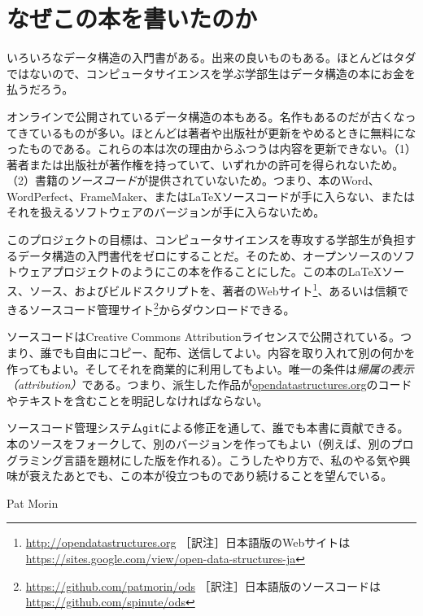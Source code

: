\chapter*{なぜこの本を書いたのか}

いろいろなデータ構造の入門書がある。出来の良いものもある。ほとんどはタダではないので、コンピュータサイエンスを学ぶ学部生はデータ構造の本にお金を払うだろう。

オンラインで公開されているデータ構造の本もある。名作もあるのだが古くなってきているものが多い。ほとんどは著者や出版社が更新をやめるときに無料になったものである。これらの本は次の理由からふつうは内容を更新できない。（1）著者または出版社が著作権を持っていて、いずれかの許可を得られないため。（2）書籍の\emph{ソースコード}が提供されていないため。つまり、本のWord、WordPerfect、FrameMaker、または\LaTeX{}ソースコードが手に入らない、またはそれを扱えるソフトウェアのバージョンが手に入らないため。

このプロジェクトの目標は、コンピュータサイエンスを専攻する学部生が負担するデータ構造の入門書代をゼロにすることだ。そのため、オープンソースのソフトウェアプロジェクトのようにこの本を作ることにした。この本の\LaTeX{}ソース、\lang{}ソース、およびビルドスクリプトを、著者のWebサイト\footnote {\url{http://opendatastructures.org} ［訳注］日本語版のWebサイトは\url{https://sites.google.com/view/open-data-structures-ja}}、あるいは信頼できるソースコード管理サイト\footnote {\url{https://github.com/patmorin/ods} ［訳注］日本語版のソースコードは\url{https://github.com/spinute/ods}}からダウンロードできる。

ソースコードはCreative Commons Attributionライセンスで公開されている。つまり、誰でも自由にコピー、配布、送信してよい。内容を取り入れて別の何かを作ってもよい。そしてそれを商業的に利用してもよい。唯一の条件は\emph{帰属の表示（attribution）}である。つまり、派生した作品が\url{opendatastructures.org}のコードやテキストを含むことを明記しなければならない。

ソースコード管理システム\texttt{git}による修正を通して、誰でも本書に貢献できる。本のソースをフォークして、別のバージョンを作ってもよい（例えば、別のプログラミング言語を題材にした版を作れる）。こうしたやり方で、私のやる気や興味が衰えたあとでも、この本が役立つものであり続けることを望んでいる。

\hfill Pat Morin
